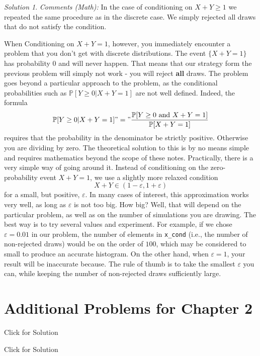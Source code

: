 \documentclass[
]{book}
\theoremstyle{definition}
\theoremstyle{definition}
\theoremstyle{definition}
\theoremstyle{definition}
\theoremstyle{remark}
\newtheorem*{solution}{Solution}
\begin{document}
\begin{solution}
\emph{Comments (Math):} In the case of conditioning on \(X+Y\geq 1\) we repeated the same procedure as in the discrete case. We simply rejected all draws that do not satisfy the condition.

When Conditioning on \(X+Y=1\), however, you immediately encounter a problem that you don't get with discrete distributions. The event \(\{ X+Y=1\}\) has probability \(0\) and will never happen.
That means that our strategy form the previous problem will simply not work - you will reject \textbf{all} draws. The problem goes beyond a particular approach to the problem, as the conditional probabilities such as \({\mathbb{P}}[ Y \geq 0 | X+Y=1]\) are not well defined. Indeed, the formula
\[ {\mathbb{P}}[ Y \geq 0 | X+Y=1] "=" \frac{{\mathbb{P}}[ Y\geq 0 \text{ and } X+Y=1]}{ {\mathbb{P}}[X+Y=1]}\]
requires that the probability in the denominator be strictly positive. Otherwise you are dividing by zero. The theoretical solution to this is by no means simple and requires mathematics beyond the scope of these notes. Practically, there is a very simple way of going around it. Instead of conditioning on the zero-probability event \(X+Y=1\), we use a slightly more relaxed condition
\[ X+Y \in (1-\varepsilon, 1+\varepsilon) \] for a small, but positive, \(\varepsilon\). In many cases of interest, this approximation works very well, as long as \(\varepsilon\) is not too big. How big? Well, that will depend on the particular problem, as well as on the number of simulations you are drawing. The best way is to try several values and experiment. For example, if we chose \(\varepsilon=0.01\) in our problem, the number of elements in \texttt{x\_cond} (i.e., the number of non-rejected draws) would be on the order of \(100\), which may be considered to small to produce an accurate histogram. On the other hand, when \(\varepsilon=1\), your result will be inaccurate because. The rule of thumb is to take the smallest \(\varepsilon\) you can, while keeping the number of non-rejected draws sufficiently large.
\end{solution}

\hypertarget{additional-problems-for-chapter-2}{%
\section{Additional Problems for Chapter 2}\label{additional-problems-for-chapter-2}}

Click for Solution

Click for Solution
\end{document}
